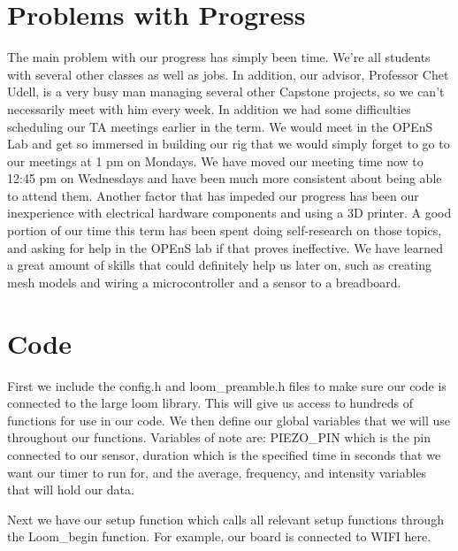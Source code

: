 \documentclass[letterpaper,10pt,draftclsnofoot,onecolumn]{article}
\begin{document}
\section{Problems with Progress}
The main problem with our progress has simply been time. We're all students with several other classes as well as jobs. In addition, our advisor, Professor Chet Udell, is a very busy man managing several other Capstone projects, so we can't necessarily meet with him every week. In addition we had some difficulties scheduling our TA meetings earlier in the term. We would meet in the OPEnS Lab and get so immersed in building our rig that we would simply forget to go to our meetings at 1 pm on Mondays. We have moved our meeting time now to 12:45 pm on Wednesdays and have been much more consistent about being able to attend them. Another factor that has impeded our progress has been our inexperience with electrical hardware components and using a 3D printer. A good portion of our time this term has been spent doing self-research on those topics, and asking for help in the OPEnS lab if that proves ineffective. We have learned a great amount of skills that could definitely help us later on, such as creating mesh models and wiring a microcontroller and a sensor to a breadboard.

\section{Code}


\vspace{4mm}
First we include the config.h and loom\_preamble.h files to make sure our code is connected to the large loom library. This will give us access to hundreds of functions for use in our code. We then define our global variables that we will use throughout our functions. Variables of note are: PIEZO\_PIN which is the pin connected to our sensor, duration which is the specified time in seconds that we want our timer to run for, and the average, frequency, and intensity variables that will hold our data.

\vspace{4mm}


\vspace{4mm}
Next we have our setup function which calls all relevant setup functions through the Loom\_begin function. For example, our board is connected to WIFI here.
\end{document}
